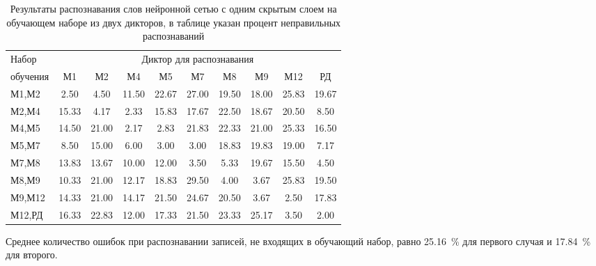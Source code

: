 \begin{table}[h]
	\centering
	\caption{Результаты распознавания слов нейронной сетью с одним скрытым слоем на обучающем наборе из двух дикторов, в таблице указан процент неправильных распознаваний}
	\label{tab:mlp1_dictor2}
	\begin{tabular}{| l | c | c | c | c | c | c | c | c | c |}
		\hline
		Набор & \multicolumn{9}{c|}{Диктор для распознавания} \\
		\hhline{~---------}
		обучения \phantom{0000} & М1    & М2    & М4    & М5    & М7    & М8    & М9    & М12   & РД 	 \\
		\hline
		М1,М2	 &  2.50 &  4.50 & 11.50 & 22.67 & 27.00 & 19.50 & 18.00 & 25.83 & 19.67 \\
		М2,М4	 & 15.33 &  4.17 &  2.33 & 15.83 & 17.67 & 22.50 & 18.67 & 20.50 &  8.50 \\
		М4,М5	 & 14.50 & 21.00 &  2.17 &  2.83 & 21.83 & 22.33 & 21.00 & 25.33 & 16.50 \\
		М5,М7	 &  8.50 & 15.00 &  6.00 &  3.00 &  3.00 & 18.83 & 19.83 & 19.00 &  7.17 \\
		М7,М8	 & 13.83 & 13.67 & 10.00 & 12.00 &  3.50 &  5.33 & 19.67 & 15.50 &  4.50 \\
		М8,М9	 & 10.33 & 21.00 & 12.17 & 18.83 & 29.50 &  4.00 &  3.67 & 25.83 & 19.50 \\
		М9,М12	 & 14.33 & 21.00 & 14.17 & 21.50 & 24.67 & 20.50 &  3.67 &  2.50 & 17.83 \\
		М12,РД	 & 16.33 & 22.83 & 12.00 & 17.33 & 21.50 & 23.33 & 25.17 &  3.50 &  2.00 \\
		\hline
	\end{tabular}
\end{table}

Среднее количество ошибок при распознавании записей, не входящих в обучающий набор, равно 25.16~\% для первого случая и 17.84~\% для второго.

